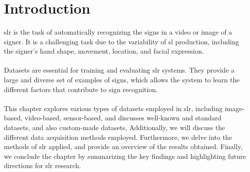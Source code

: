 \section{Introduction}
\paragraph{}
\ac{slr} is the task of automatically recognizing the signs in a video or image of a signer. It is a challenging task due to the variability of \ac{sl} production, including the signer's hand shape, movement, location, and facial expression.
\paragraph{}
Datasets are essential for training and evaluating \ac{slr} systems. They provide a large and diverse set of examples of signs, which allows the system to learn the different factors that contribute to sign recognition.
\paragraph{}
This chapter explores various types of datasets employed in \ac{slr}, including image-based, video-based, sensor-based, and discusses well-known and standard datasets, and also custom-made datasets, Additionally, we will discuss the different data acquisition methods employed. Furthermore, we delve into the methods of \ac{slr} applied, and provide an overview of the results obtained. Finally, we conclude the chapter by summarizing the key findings and highlighting future directions for \ac{slr} research.